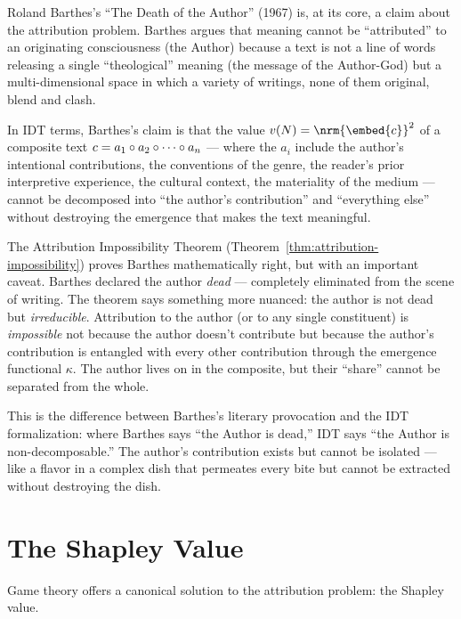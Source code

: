 \begin{interpretation}
\label{interp:ch21:barthes_death_author}
Roland Barthes's ``The Death of the Author'' (1967) is, at its core, a
claim about the attribution problem.  Barthes argues that meaning cannot
be ``attributed'' to an originating consciousness (the Author) because a
text is not a line of words releasing a single ``theological'' meaning
(the message of the Author-God) but a multi-dimensional space in which a
variety of writings, none of them original, blend and clash.

In IDT terms, Barthes's claim is that the value $v(N) = \nrm{\embed{c}}^2$
of a composite text $c = a_1 \circ a_2 \circ \cdots \circ a_n$ ---
where the $a_i$ include the author's intentional contributions, the
conventions of the genre, the reader's prior interpretive experience,
the cultural context, the materiality of the medium --- cannot be
decomposed into ``the author's contribution'' and ``everything else''
without destroying the emergence that makes the text meaningful.

The Attribution Impossibility Theorem (Theorem~\ref{thm:attribution-impossibility})
proves Barthes mathematically right, but with an important caveat.  Barthes
declared the author \emph{dead} --- completely eliminated from the scene of
writing.  The theorem says something more nuanced: the author is not dead
but \emph{irreducible}.  Attribution to the author (or to any single
constituent) is \emph{impossible} not because the author doesn't contribute
but because the author's contribution is entangled with every other
contribution through the emergence functional $\kappa$.  The author lives
on in the composite, but their ``share'' cannot be separated from the whole.

This is the difference between Barthes's literary provocation and the IDT
formalization: where Barthes says ``the Author is dead,'' IDT says ``the
Author is non-decomposable.''  The author's contribution exists but
cannot be isolated --- like a flavor in a complex dish that permeates
every bite but cannot be extracted without destroying the dish.
\end{interpretation}

\section{The Shapley Value}

Game theory offers a canonical solution to the attribution problem: the
Shapley value.


